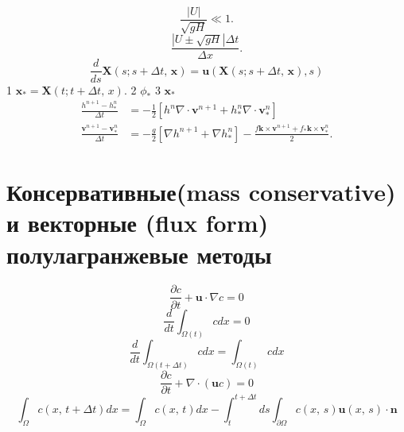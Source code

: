 %
%
\begin{equation}
\label{eq:equation8_5}
\frac{|U|}{\sqrt{gH}} \ll 1.
\end{equation}
%
%
\begin{equation}
\label{eq:equation8_6}
\frac{|U\pm\sqrt{gH}|\Delta t}{\Delta x}.
\end{equation}
%
%
\begin{equation}
\label{eq:equation8_7}
\frac{d}{ds}\mathbf{X}(s;s+\Delta t,\,\mathbf{x})=\mathbf{u}(\mathbf{X}(s;s+\Delta t,\,\mathbf{x}), s)
\end{equation}
%
1 $\mathbf{x}_{*}=\mathbf{X}(t; t + \Delta t,\,x).$ 2 $\phi_*$ 3 $\mathbf{x}_*$
%
\begin{align}
\label{eq:equation8_8}
\frac{h^{n+1}-h_{*}^n}{\Delta t}&=-\frac{1}{2} [h^n\nabla \cdot \mathbf{v}^{n+1} + h_*^n \nabla \cdot \mathbf{v}_{*}^n] \\
\label{eq:equation8_9}
\frac{\mathbf{v}^{n+1}-\mathbf{v}_{*}^n}{\Delta t}&=-\frac{g}{2}[\nabla h^{n+1}+\nabla h_{*}^n] - \frac{f\mathbf{k}\times\mathbf{v}^{n+1}+f_{*}\mathbf{k}\times\mathbf{v}_{*}^n}{2}.
\end{align}
%
\chapter{Консервативные(mass conservative) и векторные (flux form) полулагранжевые методы} \label{chapt_9}
%
\begin{equation}
\label{eq:equation9_1}
\frac{\partial c}{\partial t} + \mathbf{u}\cdot\nabla c = 0
\end{equation}
%
%
\begin{equation}
\label{eq:equation9_2}
\frac{d}{dt} \int_{\Omega (t)} cdx = 0
\end{equation}
%
%
\begin{equation}
\label{eq:equation9_3}
\frac{d}{dt} \int_{\Omega (t+\Delta t)} cdx = \int_{\Omega (t)} cdx
\end{equation}
%
%
\begin{equation}
\label{eq:equation9_4}
\frac{\partial c}{\partial t} + \nabla\cdot(\mathbf{u}c) = 0
\end{equation}
%
%
\begin{equation}
\label{eq:equation9_5}
\int_{\Omega}c(x,\,t +\Delta t)dx=\int_{\Omega}c(x,\,t)dx-\int_{t}^{t+\Delta t}ds\int_{\partial\Omega}c(x,\,s)\mathbf{u}(x,\,s)\cdot\mathbf{n}
\end{equation}
%
\newpage
